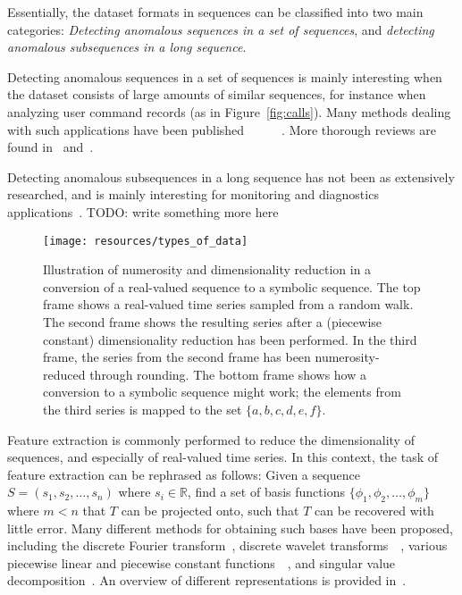 Essentially, the dataset formats in sequences can be classified into two main categories: \emph{Detecting anomalous sequences in a set of sequences}, and \emph{detecting anomalous subsequences in a long sequence}.

Detecting anomalous sequences in a set of sequences is mainly interesting when the dataset consists of large amounts of similar sequences, for instance when analyzing user command records (as in Figure~\ref{fig:calls}). Many methods dealing with such applications have been published~\cite{blender}~\cite{chan}~\cite{ye}~\cite{forrest}~\cite{sekar1}~\cite{sekar2}. More thorough reviews are found in~\cite{chandola2} and~\cite{chandola3}.

Detecting anomalous subsequences in a long sequence has not been as extensively researched, and is mainly interesting for monitoring and diagnostics applications~\cite{TODO}. TODO: write something more here 

\begin{figure}[htb]
  \begin{center}
    \leavevmode
    \texttt{[image: resources/types\_of\_data]}
  \end{center}
  \caption{\small{Illustration of numerosity and dimensionality reduction in a conversion of a real-valued sequence to a symbolic sequence. The top frame shows a real-valued time series sampled from a random walk. The second frame shows the resulting series after a (piecewise constant) dimensionality reduction has been performed. In the third frame, the series from the second frame has been numerosity-reduced through rounding. The bottom frame shows how a conversion to a symbolic sequence might work; the elements from the third series is mapped to the set $\{a,b,c,d,e,f\}$.}}
\label{fig:types_of_data}
\end{figure}

Feature extraction is commonly performed to reduce the dimensionality of sequences, and especially of real-valued time series. In this context, the task of feature extraction can be rephrased as follows: Given a sequence $S = ( s_1, s_2, \dots, s_n )$ where $s_i \in \mathbb{R}$, find a set of basis functions $\{ \phi_1, \phi_2, \dots, \phi_m \}$ where $m < n$ that $T$ can be projected onto, such that $T$ can be recovered with little error. Many different methods for obtaining such bases have been proposed, including the discrete Fourier transform~\cite{faloutsos1}, discrete wavelet transforms~\cite{pong}~\cite{fu}, various piecewise linear and piecewise constant functions~\cite{keogh3}~\cite{geurts}, and singular value decomposition~\cite{keogh3}. An overview of different representations is provided in~\cite{fabian}.

